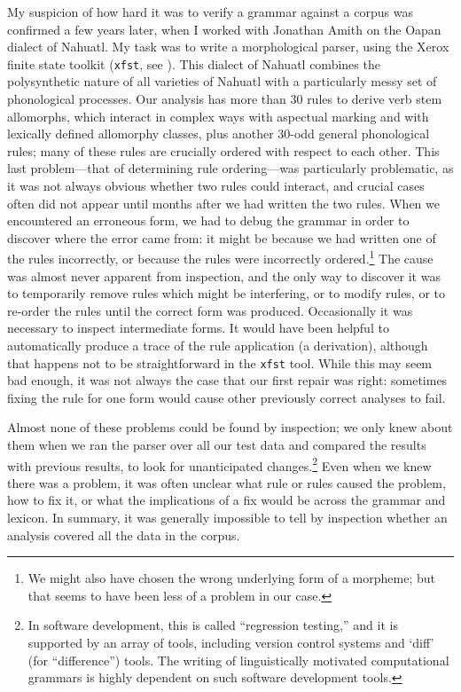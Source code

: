 My suspicion of how hard it was to verify a grammar against a corpus was confirmed a few years later, when I worked with Jonathan Amith on the Oapan dialect of Nahuatl. My task was to write a morphological parser, using the Xerox finite state toolkit (\texttt{xfst}, see \citet{BeesleyEtAl2003}). This dialect of Nahuatl combines the polysynthetic nature of all varieties of Nahuatl with a particularly messy set of phonological processes. Our analysis has more than 30 rules to derive verb stem allomorphs, which interact in complex ways with aspectual marking and with lexically defined allomorphy classes, plus another 30-odd general phonological rules; many of these rules are crucially ordered with respect to each other. This last problem---that of determining rule ordering---was particularly problematic, as it was not always obvious whether two rules could interact, and crucial cases often did not appear until months after we had written the two rules. When we encountered an erroneous form, we had to debug the grammar in order to discover where the error came from: it might be because we had written one of the rules incorrectly, or because the rules were incorrectly ordered.\footnote{We
  might also have chosen the wrong underlying form of a morpheme; but  that seems to have been less of a problem in our case.} The cause was almost never apparent from inspection, and the only way to discover it was to temporarily remove rules which might be interfering, or to modify rules, or to re-order the rules until the correct form was produced. Occasionally it was necessary to inspect intermediate forms. It would have been helpful to automatically produce a trace of the rule application (a derivation), although that happens not to be straightforward in the \texttt{xfst} tool. While this may seem bad enough, it was not always the case that our first repair was right: sometimes fixing the rule for one form would cause other previously correct analyses to fail. 

Almost none of these problems could be found by inspection; we only knew about them when we ran the parser over all our test data and compared the results with previous results, to look for unanticipated changes.\footnote{In
  software development, this is called ``regression testing,'' and it is supported by an array of tools, including version control systems and `diff' (for ``difference'') tools. The writing of linguistically motivated computational grammars is highly dependent on such software development tools.
}
Even when we knew there was a problem, it was often unclear what rule or rules caused the problem, how to fix it, or what the implications of a fix would be across the grammar and lexicon. In summary, it was generally impossible to tell by inspection whether an analysis covered all the data in the corpus.

